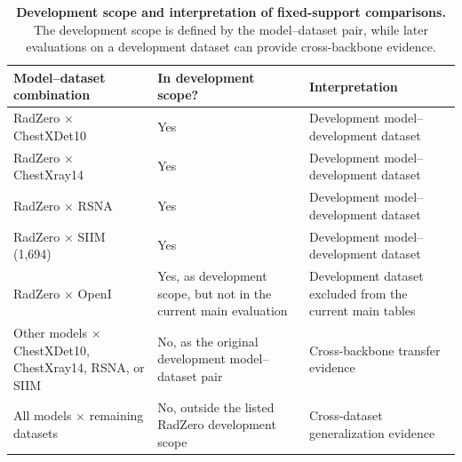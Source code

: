 \begin{table}[t]
\centering
\caption{\textbf{Development scope and interpretation of fixed-support comparisons.} The development scope is defined by the model--dataset pair, while later evaluations on a development dataset can provide cross-backbone evidence.}
\label{tab:supp-development-scope}
\footnotesize
\setlength{\tabcolsep}{4pt}
\renewcommand{\arraystretch}{1.12}
\begin{tabular*}{\textwidth}{@{\extracolsep{\fill}}p{}p{}p{}@{}}
\toprule
Model--dataset combination & In development scope? & Interpretation \\
\midrule
RadZero $\times$ ChestXDet10 & Yes & Development model--development dataset \\
RadZero $\times$ ChestXray14 & Yes & Development model--development dataset \\
RadZero $\times$ RSNA & Yes & Development model--development dataset \\
RadZero $\times$ SIIM (1,694) & Yes & Development model--development dataset \\
RadZero $\times$ OpenI & Yes, as development scope, but not in the current main evaluation & Development dataset excluded from the current main tables \\
Other models $\times$ ChestXDet10, ChestXray14, RSNA, or SIIM & No, as the original development model--dataset pair & Cross-backbone transfer evidence \\
All models $\times$ remaining datasets & No, outside the listed RadZero development scope & Cross-dataset generalization evidence \\
\bottomrule
\end{tabular*}
\end{table}
